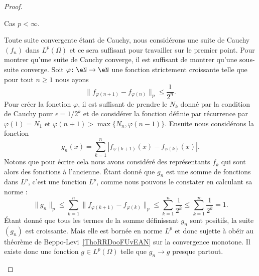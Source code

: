\begin{proof}
\begin{subproof}
\item[Cas \( p<\infty\).]

        Toute suite convergente étant de Cauchy, nous considérons une suite de Cauchy \( (f_n)\) dans \( L^p(\Omega)\) et ce sera suffisant pour travailler sur le premier point. Pour montrer qu'une suite de Cauchy converge, il est suffisant de montrer qu'une sous-suite converge. Soit \( \varphi\colon \eN\to \eN\) une fonction strictement croissante telle que pour tout \( n\geq 1\) nous ayons
        \begin{equation}
            \| f_{\varphi(n+1)}-f_{\varphi(n)} \|_p\leq \frac{1}{ 2^{n} }.
        \end{equation}
        Pour créer la fonction \( \varphi\), il est suffisant de prendre le \( N_k\) donné par la condition de Cauchy pour \( \epsilon=1/2^k\) et de considérer la fonction définie par récurrence par \( \varphi(1)=N_1\) et \( \varphi(n+1)>\max\{ N_n,\varphi(n-1) \}\). Ensuite nous considérons la fonction
        \begin{equation}
            g_n(x)=\sum_{k=1}^n| f_{\varphi(k+1)}(x)-f_{\varphi(k)}(x) |.
        \end{equation}
        Notons que pour écrire cela nous avons considéré des représentants \( f_k\) qui sont alors des fonctions à l'ancienne. Étant donné que \( g_n\) est une somme de fonctions dans \( L^p\), c'est une fonction \( L^p\), comme nous pouvons le constater en calculant sa norme :
        \begin{equation}
            \| g_n \|_p\leq \sum_{k=1}^n\| f_{\varphi(k+1)}-f_{\varphi(k)} \|_p\leq\sum_{k=1}^n\frac{1}{ 2^k }\leq\sum_{k=1}^{\infty}\frac{1}{ 2^k }=1.
        \end{equation}
        Étant donné que tous les termes de la somme définissant \( g_n\) sont positifs, la suite \( (g_n)\) est croissante. Mais elle est bornée en norme \( L^p\) et donc sujette à obéir au théorème de Beppo-Levi~\ref{ThoRRDooFUvEAN} sur la convergence monotone. Il existe donc une fonction \( g\in L^p(\Omega)\) telle que \( g_n\to g\) presque partout.


\end{subproof}
\end{proof}
